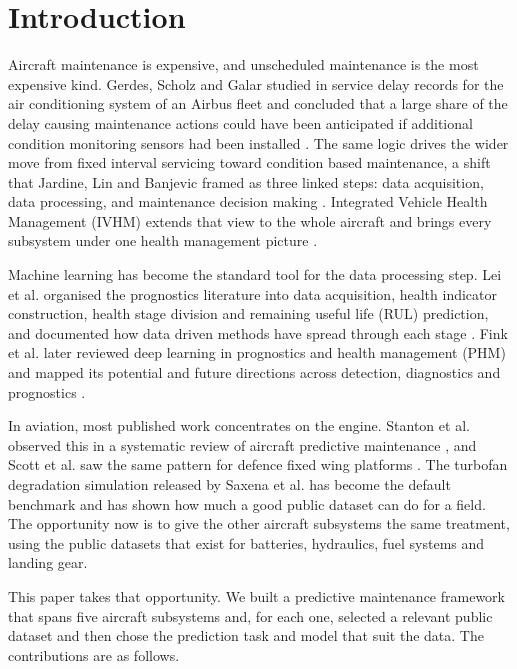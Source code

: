 \documentclass[conference]{IEEEtran}
\begin{document}
\section{Introduction}
Aircraft maintenance is expensive, and unscheduled maintenance is the most expensive kind. Gerdes, Scholz and Galar studied in service delay records for the air conditioning system of an Airbus fleet and concluded that a large share of the delay causing maintenance actions could have been anticipated if additional condition monitoring sensors had been installed \cite{b6}. The same logic drives the wider move from fixed interval servicing toward condition based maintenance, a shift that Jardine, Lin and Banjevic framed as three linked steps: data acquisition, data processing, and maintenance decision making \cite{b3}. Integrated Vehicle Health Management (IVHM) extends that view to the whole aircraft and brings every subsystem under one health management picture \cite{b5}.

Machine learning has become the standard tool for the data processing step. Lei et al. organised the prognostics literature into data acquisition, health indicator construction, health stage division and remaining useful life (RUL) prediction, and documented how data driven methods have spread through each stage \cite{b4}. Fink et al. later reviewed deep learning in prognostics and health management (PHM) and mapped its potential and future directions across detection, diagnostics and prognostics \cite{b15}.

In aviation, most published work concentrates on the engine. Stanton et al. observed this in a systematic review of aircraft predictive maintenance \cite{b1}, and Scott et al. saw the same pattern for defence fixed wing platforms \cite{b2}. The turbofan degradation simulation released by Saxena et al. \cite{b8, b9} has become the default benchmark and has shown how much a good public dataset can do for a field. The opportunity now is to give the other aircraft subsystems the same treatment, using the public datasets that exist for batteries, hydraulics, fuel systems and landing gear.

This paper takes that opportunity. We built a predictive maintenance framework that spans five aircraft subsystems and, for each one, selected a relevant public dataset and then chose the prediction task and model that suit the data. The contributions are as follows.
\end{document}
